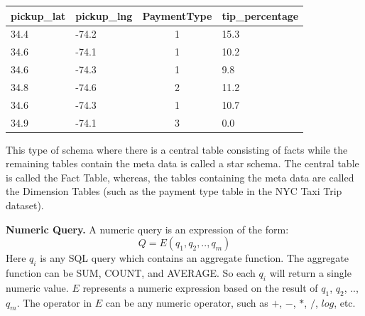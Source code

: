 \begin{center}
\small
  \begin{tabular}{ | l | l | c | l | }
    \hline
    \textbf{pickup\_lat} & \textbf{pickup\_lng} & \textbf{PaymentType} & \textbf{tip\_percentage} \\ \hline
    34.4 & -74.2 & 1 & 15.3 \\ \hline
    34.6 & -74.1 & 1 & 10.2 \\ \hline
    34.6 & -74.3 & 1 & 9.8 \\ \hline
    34.8 & -74.6 & 2 & 11.2 \\ \hline
    34.6 & -74.3 & 1 & 10.7 \\ \hline
    34.9 & -74.1 & 3 & 0.0 \\
    \hline
  \end{tabular}
\end{center}
\label{tbl:fact}

This type of schema where there is a central table consisting of facts while the remaining tables contain the meta data is called a star schema. The central table is called the Fact Table, whereas, the tables containing the meta data are called the Dimension Tables (such as the payment type table in the NYC Taxi Trip dataset).%



{\bf Numeric Query.} A numeric query is an expression of the form:
$$Q = E(q_1, q_2, .., q_m)$$
Here $q_i$ is any SQL query which contains an aggregate function. The aggregate function can be SUM, COUNT, and AVERAGE. So each $q_i$ will return a single numeric value. $E$ represents a numeric expression based on the result of $q_1$, $q_2$, .., $q_m$. The operator in $E$ can be any numeric operator, such as $+$, $-$, $*$, $/$, $log$, etc.

